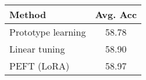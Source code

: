 \begin{tabular}{l c}
\midrule
\textbf{Method} & \textbf{Avg. Acc} \\ \midrule
Prototype learning & 58.78 \\
Linear tuning & 58.90 \\
PEFT (LoRA) & 58.97 \\
\bottomrule
\end{tabular}
